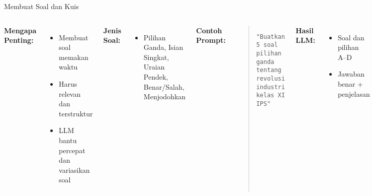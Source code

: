 \documentclass[aspectratio=169, table]{beamer}
\begin{document}
\begin{frame}[fragile]{Membuat Soal dan Kuis}
	\vspace{20pt}
	\small
	\begin{columns}[T]
		\textbf{Mengapa Penting:}
		\begin{itemize}
			\item Membuat soal memakan waktu
			\item Harus relevan dan terstruktur
			\item LLM bantu percepat dan variasikan soal
		\end{itemize}
		
		\textbf{Jenis Soal:}
		\begin{itemize}
			\item Pilihan Ganda, Isian Singkat, Uraian Pendek, Benar/Salah, Menjodohkan
		\end{itemize}
		
		\textbf{Contoh Prompt:}
		\begin{quote}
			\centering
			\texttt{"Buatkan 5 soal pilihan ganda tentang revolusi industri kelas XI IPS"}
		\end{quote}
		
		\textbf{Hasil LLM:}
		\begin{itemize}
			\item Soal dan pilihan A–D
			\item Jawaban benar + penjelasan
		\end{itemize}
		
		\textbf{Penggunaan:}
		\begin{itemize}
			\item Cetak atau unggah ke platform digital
			\item Latihan harian, remedial, tugas kelompok
		\end{itemize}
		
		\textbf{Penyesuaian:}
		\begin{itemize}
			\item Ubah gaya, tingkat, atau konteks
			\item Minta variasi soal HOTS/kontekstual
		\end{itemize}
		
		\textbf{Catatan:} Tetap periksa hasil LLM sebelum digunakan

	\end{columns}
\end{frame}
\end{document}
